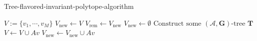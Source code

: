 \begin{algorithm}[h]
  \caption{Tree-flavored-invariant-polytope-algorithm}
  \label{alg:hybrid}
  \begin{algorithmic}
      \State $V := \{v_1, \cdots, v_M\}$
      \State $V_{\text{new}} \gets V$
          \State $V_{\text{rem}} \gets V_{\text{new}}$
          \State $V_{\text{new}} \gets \emptyset$
              \State $\text{Construct some } (\mathcal{A},\mathbf{G})\text{-tree } \mathbf{T}$
                      \State $V \gets V \cup Av$
                      \State $V_{\text{new}} \gets V_{\text{new}} \cup Av$
                  \EndIf
              \EndFor
          \EndFor
      \EndWhile \\
      \Return \\
  \end{algorithmic}
\end{algorithm}

